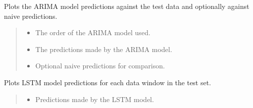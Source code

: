 \documentclass[letterpaper,10pt,english]{sphinxmanual}
\begin{document}
\begin{fulllineitems}
\begin{fulllineitems}
\label{\detokenize{docs/model_testing:model_testing.ModelTest.ARIMA_plot_pred}}
\pysigstartsignatures
{}
\pysigstopsignatures
\sphinxAtStartPar
Plots the ARIMA model predictions against the test data and optionally against naive predictions.
\begin{quote}\begin{description}
\begin{itemize}
\item {} 
\sphinxAtStartPar
{} \textendash{} The order of the ARIMA model used.

\item {} 
\sphinxAtStartPar
{} \textendash{} The predictions made by the ARIMA model.

\item {} 
\sphinxAtStartPar
{} \textendash{} Optional naive predictions for comparison.

\end{itemize}

\end{description}\end{quote}

\end{fulllineitems}


\begin{fulllineitems}
\label{\detokenize{docs/model_testing:model_testing.ModelTest.LSTM_plot_pred}}
\pysigstartsignatures
{}
\pysigstopsignatures
\sphinxAtStartPar
Plots LSTM model predictions for each data window in the test set.
\begin{quote}\begin{description}
\begin{itemize}
\item {} 
\sphinxAtStartPar
{} \textendash{} Predictions made by the LSTM model.


\end{itemize}
\end{description}
\end{quote}
\end{fulllineitems}
\end{fulllineitems}
\end{document}
